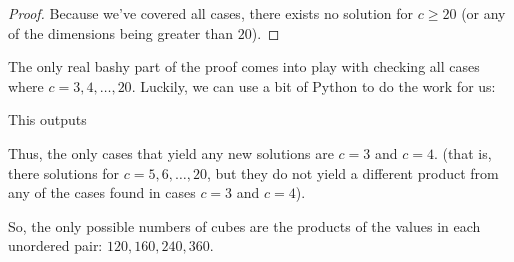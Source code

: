 \begin{solution}{2}
\begin{proof}
        Because we've covered all cases, there exists no solution for \( c \ge 20 \) (or any of the dimensions being greater than \( 20 \)).
    \end{proof}
    The only real bashy part of the proof comes into play with checking all
    cases where \( c = 3, 4,\ldots, 20 \). Luckily, we can use a bit of Python
    to do the work for us:

    
    This outputs
    

    Thus, the only cases that yield any new solutions are \( c = 3 \) and \( c = 4 \). (that is,
    there solutions for \( c = 5, 6, \ldots, 20 \), but they do not yield a
    different product from any of the cases found in cases \( c = 3 \) and \( c
    = 4 \)).

    So, the only possible numbers of cubes are the products of the values in each unordered pair: \( \boxed{120, 160, 240, 360} \).
\end{solution}
